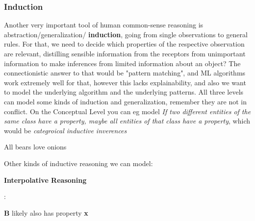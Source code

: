 \subsubsection*{Induction}

Another very important tool of human common-sense reasoning is abstraction/generalization/ \textbf{induction}, going from single observations to general rules. For that, we need to decide which properties of the respective observation are relevant, distilling sensible information from the receptors from unimportant information to make inferences from limited information about an object? The connectionistic answer to that would be "pattern matching", and ML algorithms work extremely well for that, however this lacks explainability, and also we want to model the underlying algorithm and the underlying patterns. All three levels can model some kinds of induction and generalization, remember they are not in conflict. On the Conceptual Level you can eg model \textit{If two different entities of the same class have a property, maybe all entities of that class have a property}, which would be \textit{categroical inductive inverences}

{All bears love onions \cite[226]{Gardenfors2000a}}

Other kinds of inductive reasoning we can model:

\textbf{Interpolative Reasoning}

\cite{Schockaert2011}:  

\noindent
\begin{minipage}{.6\textwidth}
\end{minipage}%
\begin{minipage}{.4\textwidth}
               {\textbf{B} likely also has property \textbf{x}}
\end{minipage}%


